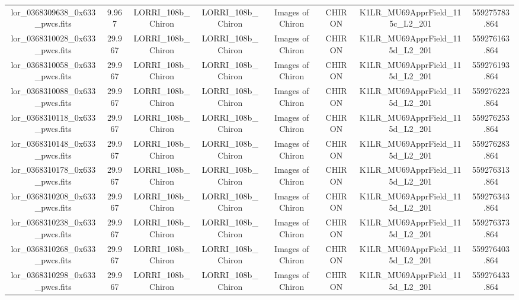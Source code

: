 \begin{table}
\begin{tabular}{cccccccc}
lor_0368309638_0x633_pwcs.fits & 9.967 & LORRI_108b_Chiron & LORRI_108b_Chiron & Images of Chiron & CHIRON & K1LR_MU69ApprField_115c_L2_201 & 559275783.864 \\
lor_0368310028_0x633_pwcs.fits & 29.967 & LORRI_108b_Chiron & LORRI_108b_Chiron & Images of Chiron & CHIRON & K1LR_MU69ApprField_115d_L2_201 & 559276163.864 \\
lor_0368310058_0x633_pwcs.fits & 29.967 & LORRI_108b_Chiron & LORRI_108b_Chiron & Images of Chiron & CHIRON & K1LR_MU69ApprField_115d_L2_201 & 559276193.864 \\
lor_0368310088_0x633_pwcs.fits & 29.967 & LORRI_108b_Chiron & LORRI_108b_Chiron & Images of Chiron & CHIRON & K1LR_MU69ApprField_115d_L2_201 & 559276223.864 \\
lor_0368310118_0x633_pwcs.fits & 29.967 & LORRI_108b_Chiron & LORRI_108b_Chiron & Images of Chiron & CHIRON & K1LR_MU69ApprField_115d_L2_201 & 559276253.864 \\
lor_0368310148_0x633_pwcs.fits & 29.967 & LORRI_108b_Chiron & LORRI_108b_Chiron & Images of Chiron & CHIRON & K1LR_MU69ApprField_115d_L2_201 & 559276283.864 \\
lor_0368310178_0x633_pwcs.fits & 29.967 & LORRI_108b_Chiron & LORRI_108b_Chiron & Images of Chiron & CHIRON & K1LR_MU69ApprField_115d_L2_201 & 559276313.864 \\
lor_0368310208_0x633_pwcs.fits & 29.967 & LORRI_108b_Chiron & LORRI_108b_Chiron & Images of Chiron & CHIRON & K1LR_MU69ApprField_115d_L2_201 & 559276343.864 \\
lor_0368310238_0x633_pwcs.fits & 29.967 & LORRI_108b_Chiron & LORRI_108b_Chiron & Images of Chiron & CHIRON & K1LR_MU69ApprField_115d_L2_201 & 559276373.864 \\
lor_0368310268_0x633_pwcs.fits & 29.967 & LORRI_108b_Chiron & LORRI_108b_Chiron & Images of Chiron & CHIRON & K1LR_MU69ApprField_115d_L2_201 & 559276403.864 \\
lor_0368310298_0x633_pwcs.fits & 29.967 & LORRI_108b_Chiron & LORRI_108b_Chiron & Images of Chiron & CHIRON & K1LR_MU69ApprField_115d_L2_201 & 559276433.864 \\
\end{tabular}
\end{table}
